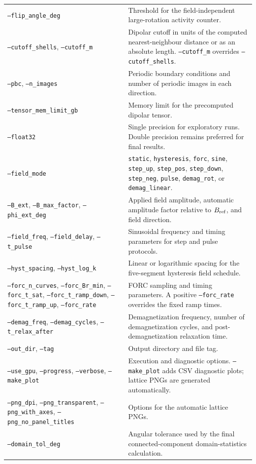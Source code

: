 \documentclass[11pt,a4paper]{article}
\newcommand{\code}[1]{\texttt{#1}}
\begin{document}
\begin{longtable}{@{}p{4.4cm}p{10.4cm}@{}}
\code{--flip\_angle\_deg} & Threshold for the field-independent large-rotation activity counter.\\
\code{--cutoff\_shells}, \code{--cutoff\_m} & Dipolar cutoff in units of the computed nearest-neighbour distance or as an absolute length. \code{--cutoff\_m} overrides \code{--cutoff\_shells}.\\
\code{--pbc}, \code{--n\_images} & Periodic boundary conditions and number of periodic images in each direction.\\
\code{--tensor\_mem\_limit\_gb} & Memory limit for the precomputed dipolar tensor.\\
\code{--float32} & Single precision for exploratory runs. Double precision remains preferred for final results.\\
\code{--field\_mode} & \code{static}, \code{hysteresis}, \code{forc}, \code{sine}, \code{step\_up}, \code{step\_pos}, \code{step\_down}, \code{step\_neg}, \code{pulse}, \code{demag\_rot}, or \code{demag\_linear}.\\
\code{--B\_ext}, \code{--B\_max\_factor}, \code{--phi\_ext\_deg} & Applied field amplitude, automatic amplitude factor relative to $B_{\rm ref}$, and field direction.\\
\code{--field\_freq}, \code{--field\_delay}, \code{--t\_pulse} & Sinusoidal frequency and timing parameters for step and pulse protocols.\\
\code{--hyst\_spacing}, \code{--hyst\_log\_k} & Linear or logarithmic spacing for the five-segment hysteresis field schedule.\\
\code{--forc\_n\_curves}, \code{--forc\_Br\_min}, \code{--forc\_t\_sat}, \code{--forc\_t\_ramp\_down}, \code{--forc\_t\_ramp\_up}, \code{--forc\_rate} & FORC sampling and timing parameters. A positive \code{--forc\_rate} overrides the fixed ramp times.\\
\code{--demag\_freq}, \code{--demag\_cycles}, \code{--t\_relax\_after} & Demagnetization frequency, number of demagnetization cycles, and post-demagnetization relaxation time.\\
\code{--out\_dir}, \code{--tag} & Output directory and file tag.\\
\code{--use\_gpu}, \code{--progress}, \code{--verbose}, \code{--make\_plot} & Execution and diagnostic options. \code{--make\_plot} adds CSV diagnostic plots; lattice PNGs are generated automatically.\\
\code{--png\_dpi}, \code{--png\_transparent}, \code{--png\_with\_axes}, \code{--png\_no\_panel\_titles} & Options for the automatic lattice PNGs.\\
\code{--domain\_tol\_deg} & Angular tolerance used by the final connected-component domain-statistics calculation.\\
\end{longtable}
\end{document}
